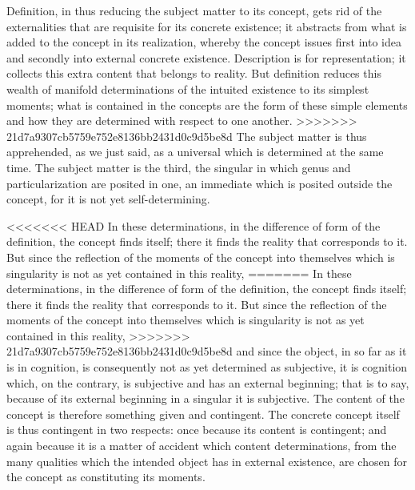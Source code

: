 Definition, in thus reducing
the subject matter to its concept,
gets rid of the externalities
that are requisite for its concrete existence;
it abstracts from what is added
to the concept in its realization,
whereby the concept issues first into idea
and secondly into external concrete existence.
Description is for representation;
it collects this extra content that belongs to reality.
But definition reduces this
wealth of manifold determinations of
the intuited existence to its simplest moments;
what is contained in the concepts are
the form of these simple elements
and how they are determined
with respect to one another.
>>>>>>> 21d7a9307cb5759e752e8136bb2431d0c9d5be8d
The subject matter is thus apprehended, as we just said,
as a universal which is determined at the same time.
The subject matter is the third,
the singular in which genus and particularization
are posited in one,
an immediate which is posited outside the concept,
for it is not yet self-determining.

<<<<<<< HEAD
In these determinations, in the difference of form of the definition,
the concept finds itself;
there it finds the reality that corresponds to it.
But since the reflection of the moments of
the concept into themselves which
is singularity is not as yet contained in this reality,
=======
In these determinations,
in the difference of form of the definition,
the concept finds itself;
there it finds the reality that corresponds to it.
But since the reflection of the moments of
the concept into themselves
which is singularity is not as yet contained in this reality,
>>>>>>> 21d7a9307cb5759e752e8136bb2431d0c9d5be8d
and since the object, in so far as it is in cognition,
is consequently not as yet determined as subjective,
it is cognition which, on the contrary, is
subjective and has an external beginning;
that is to say, because of its external
beginning in a singular it is subjective.
The content of the concept is
therefore something given and contingent.
The concrete concept itself is thus contingent in two respects:
once because its content is contingent;
and again because it is a matter of accident
which content determinations, from the many qualities
which the intended object has in external existence,
are chosen for the concept as constituting its moments.

